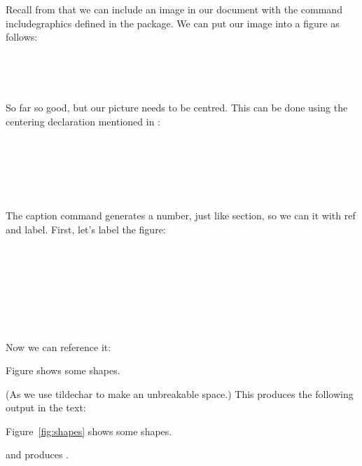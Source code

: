 Recall from  that we
can include an image in our document with
the command \gls{includegraphics} defined in the 
package.  We can put our
 image
into a figure as follows:
\begin{code}
\newline
\strut~~\newline
\strut~~\newline
{}
\end{code}%
So far so good, but our picture needs to be centred.  This can
be done using the \gls{centering} declaration mentioned in
:
\begin{code}
\newline
\strut~~\newline
\strut~~\newline
\strut~~\newline
{}
\end{code}
The \gls{caption} command generates a number, just like
\gls{section}, so we can
 it with \gls{ref} and
\gls{label}.  First, let's label the figure:
\begin{code}
\newline
\strut~~\newline
\strut~~\newline
\strut~~\newline
\strut~~\newline
{}
\end{code}%
Now we can reference it:
\begin{codeS}
Figure shows some shapes.
\end{codeS}%
(As  we use \gls{tildechar}
to make an unbreakable space.)  This produces the following output
in the text:
\begin{resultS}
Figure~\ref*{fig:shapes} shows some shapes.
\end{resultS}%
and produces .

